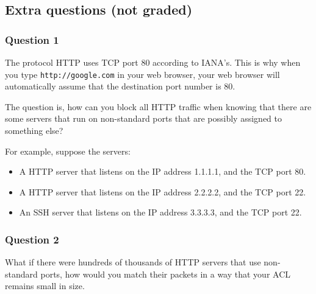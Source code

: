 \documentclass[pdftex,12pt,a4paper]{article}
\begin{document}
        \subsection{Extra questions (not graded)}
            \subsubsection{Question 1}
                The protocol HTTP uses TCP port 80 according to IANA's.  This is
                why when you type \texttt{http://google.com} in your web browser,
                your web browser will automatically assume that the destination
                port number is 80.

                The question is, how can you block all HTTP traffic when knowing
                that there are some servers that run on non-standard ports that are
                possibly assigned to something else?

                For example, suppose the servers:
                \begin{itemize}
                    \item A HTTP server that listens on the IP address 1.1.1.1, and
                        the TCP port 80.
                    \item A HTTP server that listens on the IP address 2.2.2.2, and
                        the TCP port 22.
                    \item An SSH server that listens on the IP address 3.3.3.3, and
                        the TCP port 22.
                \end{itemize}

            \subsubsection{Question 2}
                What if there were hundreds of thousands of HTTP servers that
                use non-standard ports, how would you match their packets in a
                way that your ACL remains small in size.
\end{document}
